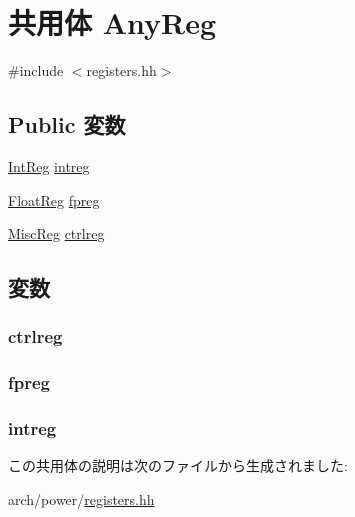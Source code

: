 \hypertarget{unionPowerISA_1_1AnyReg}{
\section{共用体 AnyReg}
\label{unionPowerISA_1_1AnyReg}
}


{\ttfamily \#include $<$registers.hh$>$}\subsection*{Public 変数}
\begin{DoxyCompactItemize}
\item 
\hyperlink{namespacePowerISA_a0e080577527fb3e9685399f75b5caf15}{IntReg} \hyperlink{unionPowerISA_1_1AnyReg_a95ddd97e75712a86f53c43636e713a94}{intreg}
\item 
\hyperlink{namespacePowerISA_a06fae4f187c7c94b8b0046dd6802be48}{FloatReg} \hyperlink{unionPowerISA_1_1AnyReg_a9154b30def3ee5315e8660e1a491c681}{fpreg}
\item 
\hyperlink{namespacePowerISA_aa16539aa6584fd12f7d6fa868f75b4de}{MiscReg} \hyperlink{unionPowerISA_1_1AnyReg_ae69c08de24012a3af86f0f33249f321d}{ctrlreg}
\end{DoxyCompactItemize}


\subsection{変数}
\hypertarget{unionPowerISA_1_1AnyReg_ae69c08de24012a3af86f0f33249f321d}{
\subsubsection[{ctrlreg}]{ {\bf ctrlreg}}}
\label{unionPowerISA_1_1AnyReg_ae69c08de24012a3af86f0f33249f321d}
\hypertarget{unionPowerISA_1_1AnyReg_a9154b30def3ee5315e8660e1a491c681}{
\subsubsection[{fpreg}]{ {\bf fpreg}}}
\label{unionPowerISA_1_1AnyReg_a9154b30def3ee5315e8660e1a491c681}
\hypertarget{unionPowerISA_1_1AnyReg_a95ddd97e75712a86f53c43636e713a94}{
\subsubsection[{intreg}]{ {\bf intreg}}}
\label{unionPowerISA_1_1AnyReg_a95ddd97e75712a86f53c43636e713a94}


この共用体の説明は次のファイルから生成されました:\begin{DoxyCompactItemize}
\item 
arch/power/\hyperlink{power_2registers_8hh}{registers.hh}\end{DoxyCompactItemize}
